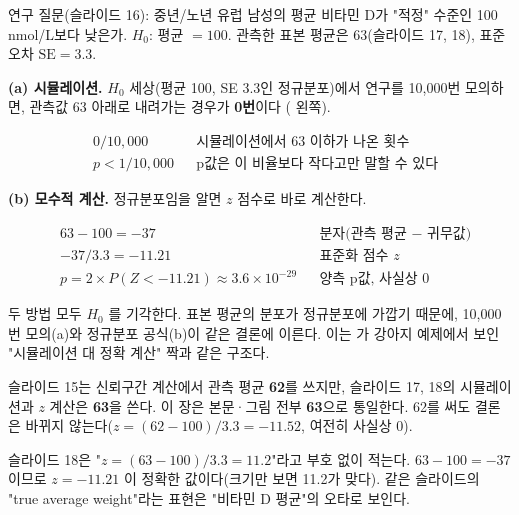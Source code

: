 \begin{example}
\label{ex:pv-vitd}
연구 질문(슬라이드 16): 중년/노년 유럽 남성의 평균 비타민 D가 "적정"
수준인 100 nmol/L보다 낮은가. $H_0$: 평균 $=100$. 관측한 표본 평균은
63(슬라이드 17, 18), 표준오차 $\mathrm{SE}=3.3$.

\textbf{(a) 시뮬레이션.} $H_0$ 세상(평균 100, SE 3.3인 정규분포)에서 연구를
10,000번 모의하면, 관측값 63 아래로 내려가는 경우가 \textbf{0번}이다
( 왼쪽).

\begin{align*}
  &0/10{,}000 && \text{시뮬레이션에서 63 이하가 나온 횟수}\\
  &p < 1/10{,}000 && \text{p값은 이 비율보다 작다고만 말할 수 있다}
\end{align*}

\textbf{(b) 모수적 계산.} 정규분포임을 알면 $z$ 점수로 바로 계산한다.

\begin{align*}
  &63-100 = -37 && \text{분자(관측 평균 $-$ 귀무값)}\\
  &-37/3.3 = -11.21 && \text{표준화 점수 } z\\
  &p = 2\times P(Z<-11.21) \approx 3.6\times10^{-29} && \text{양측 p값, 사실상 0}
\end{align*}

두 방법 모두 $H_0$ 를 기각한다. 표본 평균의 분포가 정규분포에 가깝기
때문에, 10,000번 모의(a)와 정규분포 공식(b)이 같은 결론에 이른다. 이는
가 강아지 예제에서 보인 "시뮬레이션
대 정확 계산" 짝과 같은 구조다.
\end{example}

\begin{pitfall}
\label{pit:pv-vitd-62-63}
슬라이드 15는 신뢰구간 계산에서 관측 평균 \textbf{62}를
쓰지만, 슬라이드 17, 18의 시뮬레이션과
$z$ 계산은 \textbf{63}을 쓴다. 이 장은 본문·그림 전부 \textbf{63}으로
통일한다. 62를 써도 결론은 바뀌지 않는다($z=(62-100)/3.3=-11.52$, 여전히 사실상 0).
\end{pitfall}

\begin{pitfall}[슬라이드는 부호 없이 $z=11.2$, 다시 계산하면 $z=-11.21$이다]
슬라이드 18은 "$z=(63-100)/3.3=11.2$"라고 부호 없이 적는다. $63-100=-37$
이므로 $z=-11.21$ 이 정확한 값이다(크기만 보면 11.2가 맞다). 같은 슬라이드의
"true average weight"라는 표현은 "비타민 D 평균"의 오타로 보인다.
\end{pitfall}

